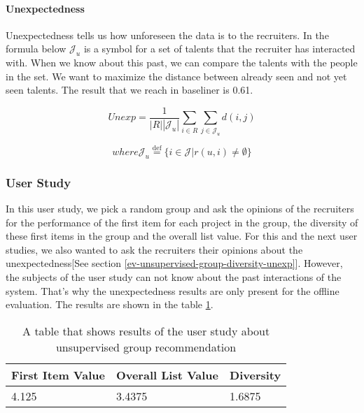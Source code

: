 \paragraph{Unexpectedness}\label{ev-unsupervised-group-unexpectedness}

Unexpectedness tells us how unforeseen the data is to the recruiters.  In the formula below $\mathcal { J } _ { u }$ is a symbol for a set of talents that the recruiter has interacted with. When we know about this past, we can compare the talents with the people in the set. We want to maximize the distance between already seen and not yet seen talents. The result that we reach in baseliner is 0.61.

$$
Unexp = \frac { 1 } { | R | \left| \mathcal { J } _ { u } \right| } \sum _ { i \in R } \sum _ { j \in \mathcal { J } _ { u } } d ( i , j )
$$

$$
where 
\mathcal { J } _ { u } \stackrel { \mathrm { def } } { = } \{ i \in \mathcal { J } | r ( u , i ) \neq \emptyset \}
$$


\subsubsection{User Study}\label{subsubsection:user-study-first-group}

In this user study, we pick a random group and ask the opinions of the recruiters for the performance of the first item for each project in the group, the diversity of these first items in the group and the overall list value. For this and the next user studies, we also wanted to ask the recruiters their opinions about the unexpectedness[See section \ref{ev-unsupervised-group-diversity-unexp}]. However, the subjects of the user study can not know about the past interactions of the system. That's why the unexpectedness results are only present for the offline evaluation. The results are shown in the table \ref{tab:user-study-group-rec-unsupervised}.

\begin{table}[ht]
	\caption[User Study Group Unsupervised]{A table that shows results of the user study about unsupervised group recommendation}\label{tab:user-study-group-rec-unsupervised}
	\centering
	\begin{tabular}{l l l}
		\toprule
		First Item Value & Overall List Value & Diversity \\
		\midrule
		4.125 & 3.4375&  1.6875\\
		\bottomrule
	\end{tabular}
\end{table}

